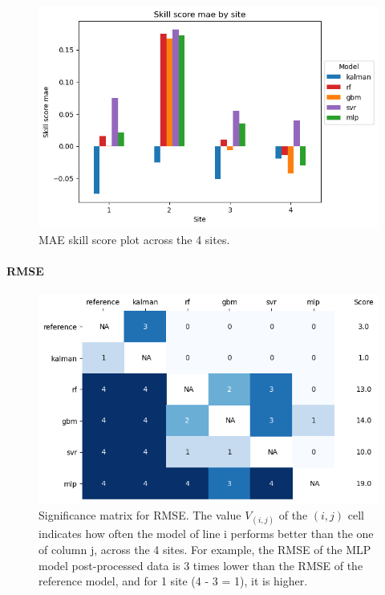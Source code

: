 \begin{figure}[htb!]
    \centering
    \includegraphics[width=\columnwidth]{figures/first_study/ss_mae.png}
    \caption{MAE skill score plot across the 4 sites.}
\end{figure}
\paragraph{RMSE}

\begin{figure}[htb!]
    \centering
    \includegraphics[width=\columnwidth]{figures/first_study/significance_matrix_rmse.png}
\caption{Significance matrix for RMSE. The value $V_{(i,j)}$ of the $(i,j)$ cell indicates how often the model of line i performs better than the one of column j, across the 
4 sites. For example, the RMSE of the MLP model post-processed data is 3 times lower than the RMSE of the reference model, and for 1 site (4 - 3 = 1), it is higher.}
\end{figure}

